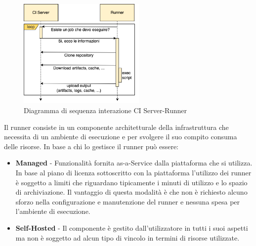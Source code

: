 \begin{figure}[H]
    \centering
    \includegraphics[width=0.55\textwidth]{img/ciserver-runner.png}
    \caption{Diagramma di sequenza interazione CI Server-Runner}
    \label{ci-server-runner}
\end{figure}

Il runner consiste in un componente architetturale della infrastruttura che necessita di un ambiente di esecuzione e per svolgere il suo compito consuma delle risorse. In base a chi lo gestisce il runner può essere:

\begin{itemize}
    \item \textbf{Managed} - Funzionalità fornita as-a-Service dalla piattaforma che si utilizza. In base al piano di licenza sottoscritto con la piattaforma l'utilizzo dei runner è soggetto a limiti che riguardano tipicamente i minuti di utilizzo e lo spazio di archiviazione. Il vantaggio di questa modalità è che non è richiesto alcuno sforzo nella configurazione e manutenzione del runner e nessuna spesa per l'ambiente di esecuzione.
    \item \textbf{Self-Hosted} - Il componente è gestito dall'utilizzatore in tutti i suoi aspetti ma non è soggetto ad alcun tipo di vincolo in termini di risorse utilizzate.
\end{itemize}